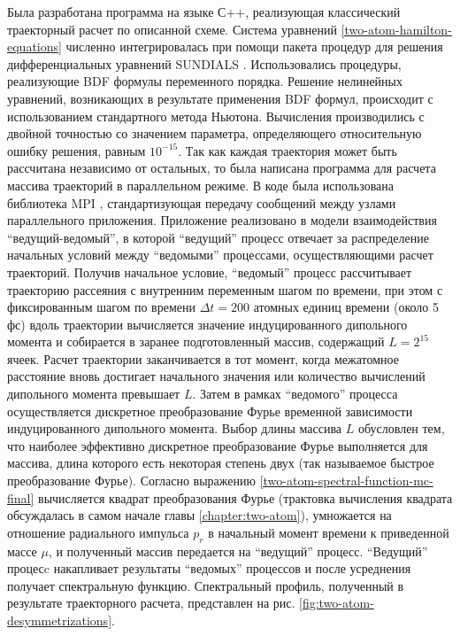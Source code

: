 Была разработана программа на языке С++, реализующая классический траекторный расчет по описанной схеме. Система уравнений \eqref{two-atom-hamilton-equations} численно интегрировалась при помощи пакета процедур для решения дифференциальных уравнений SUNDIALS \cite{sundials}. Использовались процедуры, реализующие BDF формулы переменного порядка. Решение нелинейных уравнений, возникающих в результате применения BDF формул, происходит с использованием стандартного метода Ньютона. Вычисления производились с двойной точностью со значением параметра, определяющего относительную ошибку решения, равным $10^{-15}$. Так как каждая траектория может быть рассчитана независимо от остальных, то была написана программа для расчета массива траекторий в параллельном режиме. В коде была использована библиотека MPI \cite{mpi}, стандартизующая передачу сообщений между узлами параллельного приложения. Приложение реализовано в модели взаимодействия \enquote{ведущий-ведомый}, в которой \enquote{ведущий} процесс отвечает за распределение начальных условий между \enquote{ведомыми} процессами, осуществляющими расчет траекторий. Получив начальное условие, \enquote{ведомый} процесс рассчитывает траекторию рассеяния с внутренним переменным шагом по времени, при этом с фиксированным шагом по времени $\Delta t = 200$ атомных единиц времени (около 5 фс) вдоль траектории вычисляется значение индуцированного дипольного момента и собирается в заранее подготовленный массив, содержащий $L = 2^{15}$ ячеек. Расчет траектории заканчивается в тот момент, когда межатомное расстояние вновь достигает начального значения или количество вычислений дипольного момента превышает $L$. Затем в рамках \enquote{ведомого} процесса осуществляется дискретное преобразование Фурье временной зависимости индуцированного дипольного момента. Выбор длины массива $L$ обусловлен тем, что наиболее эффективно дискретное преобразование Фурье выполняется для массива, длина которого есть некоторая степень двух (так называемое быстрое преобразование Фурье). Согласно выражению \eqref{two-atom-spectral-function-mc-final} вычисляется квадрат преобразования Фурье (трактовка вычисления квадрата обсуждалась в самом начале главы \ref{chapter:two-atom}), умножается на отношение радиального импульса $p_r$ в начальный момент времени к приведенной массе $\mu$, и полученный массив передается на \enquote{ведущий} процесс. \enquote{Ведущий} процесc накапливает результаты \enquote{ведомых} процессов и после усреднения получает спектральную функцию.
    Спектральный профиль, полученный в результате траекторного расчета, представлен на рис. \ref{fig:two-atom-desymmetrizations}.
